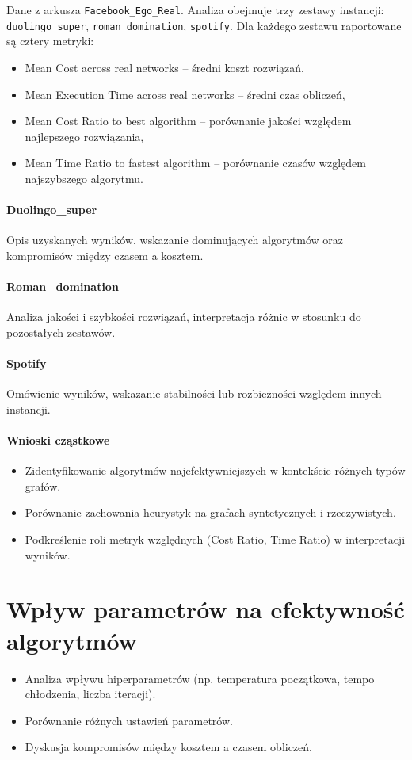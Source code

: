 Dane z arkusza \texttt{Facebook\_Ego\_Real}. Analiza obejmuje trzy zestawy instancji: \texttt{duolingo\_super}, \texttt{roman\_domination}, \texttt{spotify}. 
Dla każdego zestawu raportowane są cztery metryki:

\begin{itemize}
    \item Mean Cost across real networks – średni koszt rozwiązań,
    \item Mean Execution Time across real networks – średni czas obliczeń,
    \item Mean Cost Ratio to best algorithm – porównanie jakości względem najlepszego rozwiązania,
    \item Mean Time Ratio to fastest algorithm – porównanie czasów względem najszybszego algorytmu.
\end{itemize}

\paragraph{Duolingo\_super}
Opis uzyskanych wyników, wskazanie dominujących algorytmów oraz kompromisów między czasem a kosztem.

\paragraph{Roman\_domination}
Analiza jakości i szybkości rozwiązań, interpretacja różnic w stosunku do pozostałych zestawów.

\paragraph{Spotify}
Omówienie wyników, wskazanie stabilności lub rozbieżności względem innych instancji.

\paragraph{Wnioski cząstkowe}
\begin{itemize}
    \item Zidentyfikowanie algorytmów najefektywniejszych w kontekście różnych typów grafów.
    \item Porównanie zachowania heurystyk na grafach syntetycznych i rzeczywistych.
    \item Podkreślenie roli metryk względnych (Cost Ratio, Time Ratio) w interpretacji wyników.
\end{itemize}


\section{Wpływ parametrów na efektywność algorytmów}
\begin{itemize}
    \item Analiza wpływu hiperparametrów (np. temperatura początkowa, tempo chłodzenia, liczba iteracji).
    \item Porównanie różnych ustawień parametrów.
    \item Dyskusja kompromisów między kosztem a czasem obliczeń.
\end{itemize}